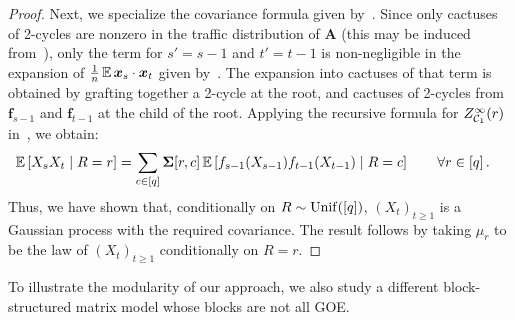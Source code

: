 \begin{proof}
    Next, we specialize the covariance formula given by~. Since
    only cactuses of 2-cycles are nonzero in the traffic distribution of $\bm A$ (this may be induced from~), only the term
    for $s'=s-1$ and $t'=t-1$ is non-negligible
    in the expansion of $\frac 1 n \operatorname*{\mathbb{E}} \bm x_s \cdot \bm x_t$ given by~. The expansion into cactuses of that
    term is obtained by grafting together a 2-cycle at the root, and cactuses of 2-cycles
    from $\bm f_{s-1}$ and $\bm f_{t-1}$ at the
    child of the root. 
    Applying the recursive formula for $Z^\infty_{{\cal C}_1}(r)$ in~, we obtain:
    \begin{align*}
        \operatorname*{\mathbb{E}} \left[X_s X_t\mid R=r\right]
        &=  \sum_{c\in [q]} \bm \Sigma[r,c] \operatorname*{\mathbb{E}}\left[f_{s-1}(X_{s-1}) f_{t-1}(X_{t-1})\mid R=c\right]\qquad \forall r\in [q]\,.
    \end{align*}
    Thus, we have shown that, conditionally on $R\sim \mathrm{Unif}([q])$, $(X_t)_{t\ge 1}$
    is a Gaussian process with the required covariance. The result follows by taking $\mu_r$ to be the law of $(X_t)_{t\ge 1}$ conditionally
    on $R=r$.
\end{proof}

To illustrate the modularity of
our approach, we also study a different
block-structured matrix
model whose blocks
are not all GOE.

